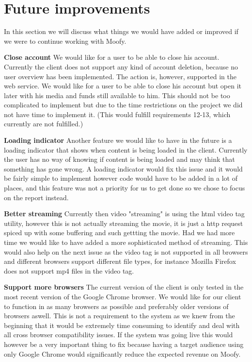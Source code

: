 \section{Future improvements}
\label{sec:futureimps}
In this section we will discuss what things we would have added or improved if we were to continue working with Moofy.

\textbf{Close account } We would like for a user to be able to close his account. Currently the client does not support any kind of account
deletion, because no user overview has been implemented. The action is, however, supported in the web service. We would like for a
user to be able to close his account but open it later with his media and funds still available to him. This should not be too complicated to 
implement but due to the time restrictions on the project we did not have time to implement it. (This would fulfill requirements 12-13, which
currently are not fulfilled.)

\textbf{Loading indicator } Another feature we would like to have in the future is a loading indicator that shows when content is being loaded in the client. 
Currently the user has no way of knowing if content is being loaded and may think that something has  gone wrong. A loading indicator would fix this issue 
and it would be fairly simple to implement however code would have to be added in a lot of places, and this feature was not a priority for us to get done so
we chose to focus on the report instead.

\textbf{Better streaming} Currently then video "streaming" is using the html video tag utility, however this is not actually streaming the movie, it is just
a http request spiced up with some buffering and such gettting the movie. Had we had more time we would like to have added a more sophisticated method
of streaming. This would also help on the next issue as the video tag is not supported in all browsers and different browsers support different file types, for
instance Mozilla Firefox does not support mp4 files in the video tag.

\textbf{Support more browsers} The current version of the client is only tested in the most recent version of the Google Chrome browser. We would like for our client to function in as 
many browsers as possible and preferably older versions of browsers aswell. This is not a requirement to the system as we knew from the beginning that it 
would be extremely time consuming to identify and deal with all cross browser compatibility issues. If the system was going live this would however be a very
important thing to fix because having a target audience using only Google Chrome would significantly reduce the expected revenue on Moofy.